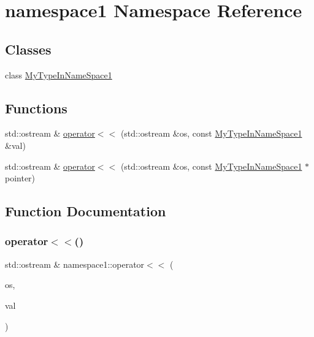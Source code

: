 \hypertarget{namespacenamespace1}{}\section{namespace1 Namespace Reference}
\label{namespacenamespace1}
\subsection*{Classes}
\begin{DoxyCompactItemize}
\item 
class \mbox{\hyperlink{classnamespace1_1_1_my_type_in_name_space1}{My\+Type\+In\+Name\+Space1}}
\end{DoxyCompactItemize}
\subsection*{Functions}
\begin{DoxyCompactItemize}
\item 
std\+::ostream \& \mbox{\hyperlink{namespacenamespace1_a469f00dab6318267fb48fab73226ca95}{operator$<$$<$}} (std\+::ostream \&os, const \mbox{\hyperlink{classnamespace1_1_1_my_type_in_name_space1}{My\+Type\+In\+Name\+Space1}} \&val)
\item 
std\+::ostream \& \mbox{\hyperlink{namespacenamespace1_a9be9cab39b3a33a012040d70e1c86949}{operator$<$$<$}} (std\+::ostream \&os, const \mbox{\hyperlink{classnamespace1_1_1_my_type_in_name_space1}{My\+Type\+In\+Name\+Space1}} $\ast$pointer)
\end{DoxyCompactItemize}


\subsection{Function Documentation}
\mbox{\label{namespacenamespace1_a469f00dab6318267fb48fab73226ca95}} 
\subsubsection{\texorpdfstring{operator$<$$<$()}{operator<<()}\hspace{0.1cm}{\footnotesize\ttfamily [1/2]}}
{\footnotesize\ttfamily std\+::ostream \& namespace1\+::operator$<$$<$ (\begin{DoxyParamCaption}\item[{std\+::ostream \&}]{os,  }\item[{const \mbox{\hyperlink{classnamespace1_1_1_my_type_in_name_space1}{My\+Type\+In\+Name\+Space1}} \&}]{val }\end{DoxyParamCaption})}

